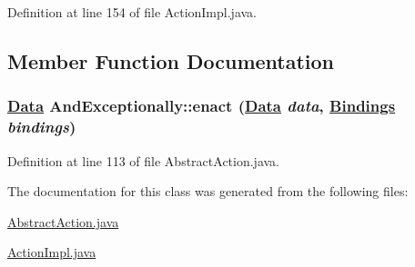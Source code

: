 Definition at line 154 of file Action\-Impl.java.

\subsection{Member Function Documentation}
\hypertarget{classAndExceptionally_a1}{
\subsubsection[enact]{\setlength{\rightskip}{0pt plus 5cm}\hyperlink{interfaceData}{Data} And\-Exceptionally::enact (\hyperlink{interfaceData}{Data} {\em data}, \hyperlink{interfaceBindings}{Bindings} {\em bindings})}}
\label{classAndExceptionally_a1}




Definition at line 113 of file Abstract\-Action.java.

The documentation for this class was generated from the following files:\begin{CompactItemize}
\item 
\hyperlink{AbstractAction_8java-source}{Abstract\-Action.java}\item 
\hyperlink{ActionImpl_8java-source}{Action\-Impl.java}\end{CompactItemize}
